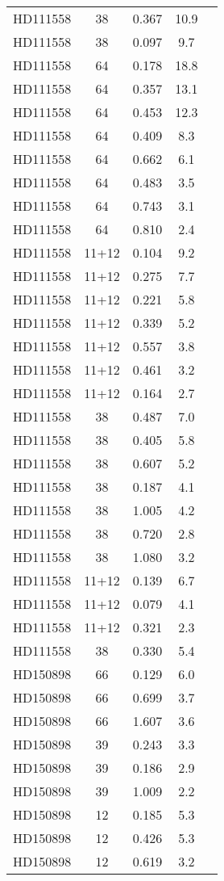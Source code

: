 \begin{table*}
\begin{tabular}{l c c c c}
HD111558 & 38 & 0.367 & 10.9\\ 
HD111558 & 38 & 0.097 & 9.7\\ 
HD111558 & 64 & 0.178 & 18.8\\ 
HD111558 & 64 & 0.357 & 13.1\\ 
HD111558 & 64 & 0.453 & 12.3\\ 
HD111558 & 64 & 0.409 & 8.3\\ 
HD111558 & 64 & 0.662 & 6.1\\ 
HD111558 & 64 & 0.483 & 3.5\\ 
HD111558 & 64 & 0.743 & 3.1\\ 
HD111558 & 64 & 0.810 & 2.4\\ 
HD111558 & 11+12 & 0.104 & 9.2\\ 
HD111558 & 11+12 & 0.275 & 7.7\\ 
HD111558 & 11+12 & 0.221 & 5.8\\ 
HD111558 & 11+12 & 0.339 & 5.2\\ 
HD111558 & 11+12 & 0.557 & 3.8\\ 
HD111558 & 11+12 & 0.461 & 3.2\\ 
HD111558 & 11+12 & 0.164 & 2.7\\ 
HD111558 & 38 & 0.487 & 7.0\\ 
HD111558 & 38 & 0.405 & 5.8\\ 
HD111558 & 38 & 0.607 & 5.2\\ 
HD111558 & 38 & 0.187 & 4.1\\ 
HD111558 & 38 & 1.005 & 4.2\\ 
HD111558 & 38 & 0.720 & 2.8\\ 
HD111558 & 38 & 1.080 & 3.2\\ 
HD111558 & 11+12 & 0.139 & 6.7\\ 
HD111558 & 11+12 & 0.079 & 4.1\\ 
HD111558 & 11+12 & 0.321 & 2.3\\ 
HD111558 & 38 & 0.330 & 5.4\\ 
\hline
HD150898 & 66 & 0.129 & 6.0\\ 
HD150898 & 66 & 0.699 & 3.7\\ 
HD150898 & 66 & 1.607 & 3.6\\ 
HD150898 & 39 & 0.243 & 3.3\\ 
HD150898 & 39 & 0.186 & 2.9\\ 
HD150898 & 39 & 1.009 & 2.2\\ 
HD150898 & 12 & 0.185 & 5.3\\ 
HD150898 & 12 & 0.426 & 5.3\\ 
HD150898 & 12 & 0.619 & 3.2\\ 

\end{tabular}
\end{table*}

